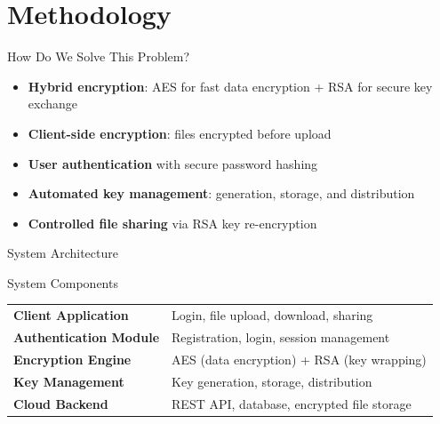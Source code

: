 \documentclass{SKP-beamer}
\begin{document}
\section{Methodology}
\begin{frame}{How Do We Solve This Problem?}
\begin{itemize}
  \item \textbf{Hybrid encryption}: AES for fast data encryption + RSA for secure key exchange
  \item \textbf{Client-side encryption}: files encrypted before upload
  \item \textbf{User authentication} with secure password hashing
  \item \textbf{Automated key management}: generation, storage, and distribution
  \item \textbf{Controlled file sharing} via RSA key re-encryption
\end{itemize}
\end{frame}

\begin{frame}[fragile]{System Architecture}
\begin{block}{System Components}
\small
\begin{tabular}{@{}ll@{}}
\textbf{Client Application} & Login, file upload, download, sharing \\[0.3em]
\textbf{Authentication Module} & Registration, login, session management \\[0.3em]
\textbf{Encryption Engine} & AES (data encryption) + RSA (key wrapping) \\[0.3em]
\textbf{Key Management} & Key generation, storage, distribution \\[0.3em]
\textbf{Cloud Backend} & REST API, database, encrypted file storage \\
\end{tabular}
\end{block}
\end{frame}
\end{document}
